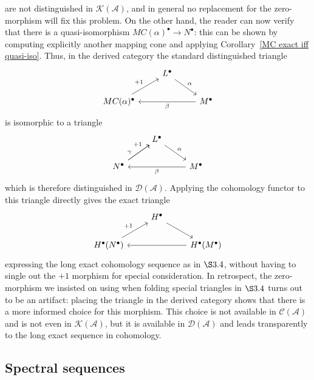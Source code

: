 are not distinguished in $\mathcal{K}(\mathcal{A})$, and in general no replacement for the zero-morphism will fix this problem. On the other hand, the reader can now verify that there is a quasi-isomorphism $MC(\alpha)^\bullet\to N^\bullet$: this can be shown by computing explicitly another mapping cone and applying Corollary~\ref{MC exact iff quasi-iso}. Thus, in the derived category the standard distinguished triangle
\[\begin{tikzcd}
&L^\bullet\ar[rd,"\alpha"]&\\
MC(\alpha)^\bullet\ar[ru,"+1"]&&M^\bullet\ar[ll,"\beta"]
\end{tikzcd}\]
is isomorphic to a triangle
\[\begin{tikzcd}
&L^\bullet\ar[rd,"\alpha"]&\\
N^\bullet\ar[ru,near start,"\gamma"]\ar[ru,near end,"+1"]&&M^\bullet\ar[ll,"\beta"]
\end{tikzcd}\]
which is therefore distinguished in $\mathcal{D}(\mathcal{A})$. Applying the cohomology functor to this triangle directly gives the exact triangle
\[\begin{tikzcd}
&H^\bullet\ar[rd]&\\
H^\bullet(N^\bullet)\ar[ru,"+1"]&&H^\bullet(M^\bullet)\ar[ll]
\end{tikzcd}\]
expressing the long exact cohomology sequence as in $\S3.4$, without having to single out the $+1$ morphism for special consideration. In retrospect, the zero-morphism we insisted on using when folding special triangles in $\S3.4$ turns out to be an artifact: placing the triangle in the derived category shows that there is a more informed choice for this morphism. This choice is not available in $\mathcal{C}(\mathcal{A})$ and is not even in $\mathcal{K}(\mathcal{A})$, but it is available in $\mathcal{D}(\mathcal{A})$ and leads transparently to the long exact
sequence in cohomology.
\subsection{Spectral sequences}
